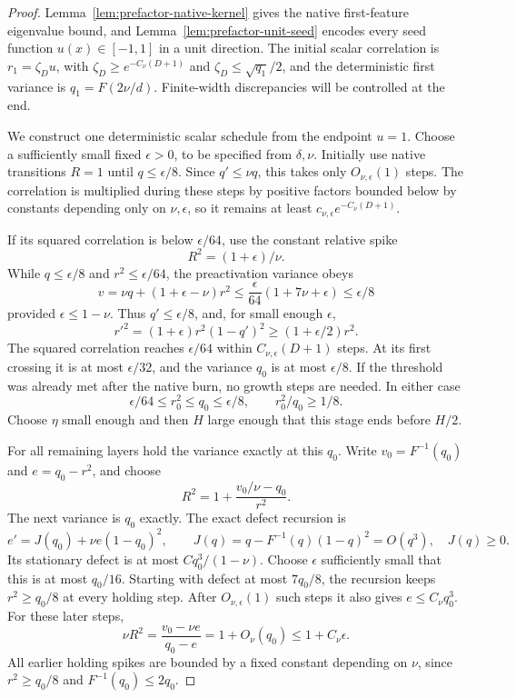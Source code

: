 \begin{proof}
Lemma~\ref{lem:prefactor-native-kernel} gives the native first-feature eigenvalue bound, and Lemma~\ref{lem:prefactor-unit-seed} encodes every seed function $u(x)\in[-1,1]$ in a unit direction. The initial scalar correlation is $r_1=\zeta_Du$, with $\zeta_D\ge e^{-C_\nu(D+1)}$ and $\zeta_D\le\sqrt{q_1}/2$, and the deterministic first variance is $q_1=F(2\nu/d)$. Finite-width discrepancies will be controlled at the end.

We construct one deterministic scalar schedule from the endpoint $u=1$. Choose a sufficiently small fixed $\epsilon>0$, to be specified from $\delta,\nu$. Initially use native transitions $R=1$ until $q\le\epsilon/8$. Since $q'\le\nu q$, this takes only $O_{\nu,\epsilon}(1)$ steps. The correlation is multiplied during these steps by positive factors bounded below by constants depending only on $\nu,\epsilon$, so it remains at least $c_{\nu,\epsilon}e^{-C_\nu(D+1)}$.

If its squared correlation is below $\epsilon/64$, use the constant relative spike
\[
 R^2=(1+\epsilon)/\nu.
\]
While $q\le\epsilon/8$ and $r^2\le\epsilon/64$, the preactivation variance obeys
\[
 v=\nu q+(1+\epsilon-\nu)r^2
 \le\frac\epsilon{64}(1+7\nu+\epsilon)\le\epsilon/8
\]
provided $\epsilon\le1-\nu$. Thus $q'\le\epsilon/8$, and, for small enough $\epsilon$,
\[
 r'^2=(1+\epsilon)r^2(1-q')^2
       \ge(1+\epsilon/2)r^2.
\]
The squared correlation reaches $\epsilon/64$ within $C_{\nu,\epsilon}(D+1)$ steps. At its first crossing it is at most $\epsilon/32$, and the variance $q_0$ is at most $\epsilon/8$. If the threshold was already met after the native burn, no growth steps are needed. In either case
\[
 \epsilon/64\le r_0^2\le q_0\le\epsilon/8,
 \qquad r_0^2/q_0\ge1/8.
\]
Choose $\eta$ small enough and then $H$ large enough that this stage ends before $H/2$.

For all remaining layers hold the variance exactly at this $q_0$. Write $v_0=F^{-1}(q_0)$ and $e=q_0-r^2$, and choose
\[
 R^2=1+\frac{v_0/\nu-q_0}{r^2}.
\]
The next variance is $q_0$ exactly. The exact defect recursion is
\[
 e'=J(q_0)+\nu e(1-q_0)^2,
 \qquad J(q)=q-F^{-1}(q)(1-q)^2=O(q^3),\quad J(q)\ge0.
\]
Its stationary defect is at most $Cq_0^3/(1-\nu)$. Choose $\epsilon$ sufficiently small that this is at most $q_0/16$. Starting with defect at most $7q_0/8$, the recursion keeps $r^2\ge q_0/8$ at every holding step. After $O_{\nu,\epsilon}(1)$ such steps it also gives $e\le C_\nu q_0^3$.
For these later steps,
\[
 \nu R^2=\frac{v_0-\nu e}{q_0-e}
        =1+O_\nu(q_0)\le1+C_\nu\epsilon.
\]
All earlier holding spikes are bounded by a fixed constant depending on $\nu$, since $r^2\ge q_0/8$ and $F^{-1}(q_0)\le2q_0$.


\end{proof}
